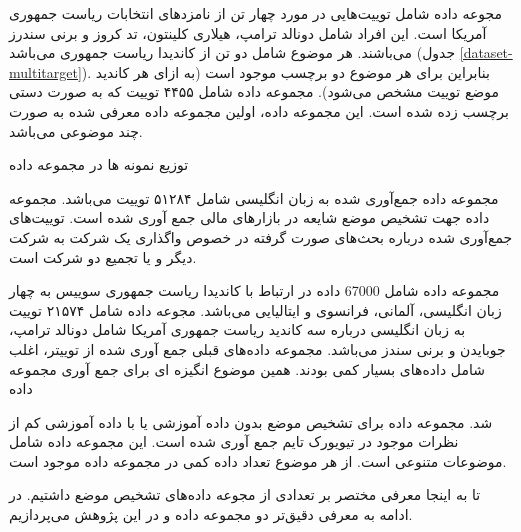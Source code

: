 مجوعه داده
\cite{sobhani-etal-2017-dataset}
شامل توییت‌هایی در مورد چهار تن از نامزد‌های انتخابات ریاست جمهوری
آمریکا است. این افراد شامل دونالد ترامپ، هیلاری کلینتون، تد کروز و برنی سندرز می‌باشند. هر موضوع شامل دو تن از کاندیدا ریاست جمهوری می‌باشد (جدول
\ref{dataset-multitarget}). بنابراین برای هر موضوع دو برچسب موجود است (به ازای هر کاندید موضع توییت مشخص می‌شود). مجموعه داده شامل ۴۴۵۵ توییت که به صورت دستی برچسب زده شده است. این مجموعه داده، اولین مجموعه داده معرفی شده به صورت چند موضوعی
می‌باشد.
\begin{table}[ht]
	\centering
	\small
	\caption[توزیع نمونە ها در مجموعه داده
	]{\label{dataset-multitarget} توزیع نمونە ها در مجموعه داده
		\cite{sobhani-etal-2017-dataset}}
	
	\begin{figure}[H]
	\end{figure}
	
\end{table}
مجموعه داده
\cite{conforti-etal-2020-will}
جمع‌آوری شده به زبان انگلیسی شامل ۵۱۲۸۴ توییت می‌باشد. مجموعه داده جهت تشخیص موضع شایعه در بازارهای مالی جمع آوری شده است. توییت‌های جمع‌آوری شده درباره بحث‌های صورت گرفته در خصوص واگذاری یک شرکت به شرکت دیگر و یا تجمیع دو شرکت است.

مجموعه داده
\cite{vamvas2020xstance}
شامل 67000 داده در ارتباط با کاندیدا ریاست جمهوری سوییس به چهار زبان انگلیسی، آلمانی، فرانسوی و ایتالیایی می‌باشد. مجوعه داده
\cite{li-etal-2021-p}
شامل ۲۱۵۷۴ توییت به زبان انگلیسی درباره سه کاندید ریاست جمهوری آمریکا شامل دونالد ترامپ، جوبایدن و برنی سندز می‌باشد. مجموعه دادە‌های قبلی جمع آوری شده از توییتر، اغلب شامل دادە‌های بسیار کمی بودند. همین موضوع انگیزە ای برای جمع آوری مجموعه داده
 
شد. مجموعه داده
\cite{Allaway2020Zero}
برای تشخیص موضع بدون داده آموزشی 
یا با داده آموزشی کم
از نظرات موجود در تیویورک تایم جمع آوری شده است. این مجموعه داده شامل موضوعات متنوعی است. از هر موضوع تعداد داده کمی در مجموعه داده
موجود است. 

تا به اینجا معرفی مختصر بر تعدادی از مجوعه‌ داده‌های تشخیص موضع داشتیم. در ادامه به معرفی دقیق‌تر دو مجموعه داده  و  در این پژوهش می‌پردازیم.

